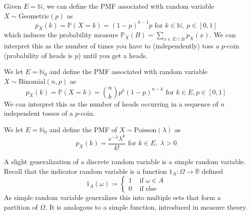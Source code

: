 \documentclass{article}
\begin{document}
      \begin{example}
        Given $E = \mathbb{N}$, we can define the PMF associated with random variable $X \sim \mathrm{Geometric}(p)$ as 
        \begin{equation}
          p_X (k) =\mathbb{P}(X = k) = (1 - p)^{k-1} p \text{ for } k \in \mathbb{N}, \; p \in [0, 1]
        \end{equation}
        which induces the probability measure $\mathbb{P}_X (B) = \sum_{x \in E \cap B} p_X (x)$. We can interpret this as the number of times you have to (independently) toss a $p$-coin (probability of heads is $p$) until you get a heads. 
      \end{example}

      \begin{example}
        We let $E = \mathbb{N}_0$ and define the PMF associated with random variable $X \sim \mathrm{Binomial}(n, p)$ as 
        \begin{equation}
          p_X (k) = \mathbb{P}(X = k) = \binom{n}{k} p^k (1 - p)^{n - k} \text{ for } k \in E, p \in [0, 1]
        \end{equation}
        We can interpret this as the number of heads occurring in a sequence of $n$ independent tosses of a $p$-coin. 
      \end{example}

      \begin{example}
        We let $E = \mathbb{N}_0$ and define the PMF of $X \sim \mathrm{Poisson}(\lambda)$ as 
        \begin{equation}
          p_X (k) = \frac{e^{-\lambda} \lambda^k}{k!} \text{ for } k \in E, \; \lambda > 0
        \end{equation}
      \end{example}

      A slight generalization of a discrete random variable is a simple random variable. Recall that the indicator random variable is a function $1_A: \Omega \rightarrow \mathbb{R}$ defined 
      \begin{equation}
        1_A (\omega) \coloneqq \begin{cases} 1 & \text{ if } \omega \in A \\
        0 & \text{ if else } \end{cases}
      \end{equation}
      As simple random variable generalizes this into multiple sets that form a partition of $\Omega$. It is analogous to a simple function, introduced in measure theory. 
\end{document}
